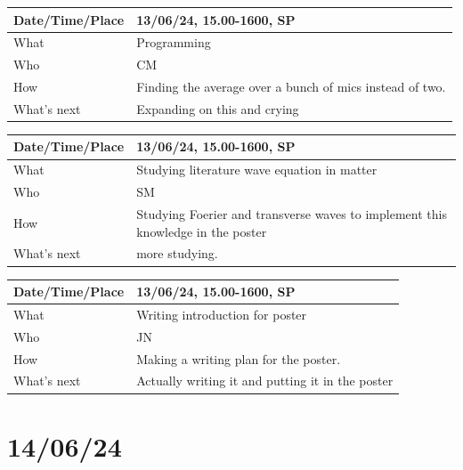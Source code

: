 \documentclass{article}
\begin{document}
\begin{table}[H]
\begin{tabular}{|p{1.5in}|p{4in}|}
\hline
Date/Time/Place & 13/06/24, 15.00-1600, SP \\ \hline
What            &  Programming\\ \hline
Who             &  CM\\ \hline
How             & Finding the average over a bunch of mics instead of two. \\ \hline
What's next     &  Expanding on this and crying \\ \hline
\end{tabular}
\end{table}

\begin{table}[H]
\begin{tabular}{|p{1.5in}|p{4in}|}
\hline
Date/Time/Place & 13/06/24, 15.00-1600, SP \\ \hline
What            & Studying literature wave equation in matter \\ \hline
Who             & SM \\ \hline
How             & Studying Foerier and transverse waves to implement this knowledge in the poster \\ \hline
What's next     & more studying. \\ \hline
\end{tabular}
\end{table}

\begin{table}[H]
\begin{tabular}{|p{1.5in}|p{4in}|}
\hline
Date/Time/Place & 13/06/24, 15.00-1600, SP \\ \hline
What            & Writing introduction for poster \\ \hline
Who             & JN \\ \hline
How             & Making a writing plan for the poster. \\ \hline
What's next     & Actually writing it and putting it in the poster \\ \hline
\end{tabular}
\end{table}


\section{14/06/24}
\end{document}
